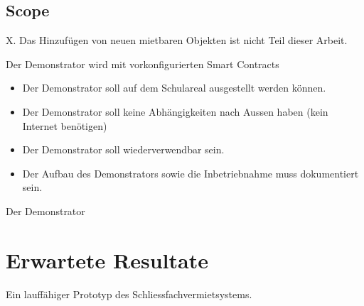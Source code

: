 \subsection{Scope}
X. Das Hinzufügen von neuen mietbaren Objekten ist nicht Teil dieser Arbeit.

Der Demonstrator wird mit vorkonfigurierten Smart Contracts 

\begin{itemize}
    \item Der Demonstrator soll auf dem Schulareal ausgestellt werden können. 
    \item Der Demonstrator soll keine Abhängigkeiten nach Aussen haben (kein Internet benötigen)
    \item Der Demonstrator soll wiederverwendbar sein.
    \item Der Aufbau des Demonstrators sowie die Inbetriebnahme muss dokumentiert sein.
\end{itemize}

Der Demonstrator 

\section{Erwartete Resultate}
\label{sec:Erwartete_Resultate}
Ein lauffähiger Prototyp des Schliessfachvermietsystems.
